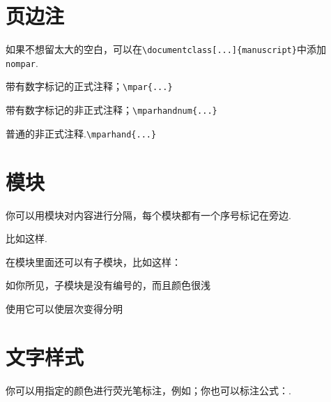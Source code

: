 \documentclass[9pt,oneside,mpar,cn]{manuscript}
\begin{document}
    \vspace{-0.5\baselineskip}
    \section{页边注}\subtitle{书写想法的绝妙空白}

        如果不想留太大的空白，可以在\verb|\documentclass[...]{manuscript}|中添加\verb|nompar|.
        \begin{itemize*}
            \item 带有数字标记的正式注释；\hfill\verb|\mpar{...}|
            \item 带有数字标记的非正式注释；\hfill\verb|\mparhandnum{...}|
            \item 普通的非正式注释.\hfill\verb|\mparhand{...}|
        \end{itemize*}

    \vspace{-0.5\baselineskip}
    \section{模块}\subtitle{适当地分割模块可以让你的思路更加清晰}

        你可以用模块对内容进行分隔，每个模块都有一个序号标记在旁边. 
        \begin{module}
            比如这样. 

            在模块里面还可以有子模块，比如这样：
            \begin{submodule}
                \begin{itemize*}
                    \item 如你所见，子模块是没有编号的，而且颜色很浅
                    \item 使用它可以使层次变得分明
                \end{itemize*}
            \end{submodule}
        \end{module}

    \vspace{-0.5\baselineskip}
    \section{文字样式}\subtitle{对文字进行一些标注有助于突出重点}

    你可以用指定的颜色进行荧光笔标注，例如；你也可以标注公式：.
\end{document}
